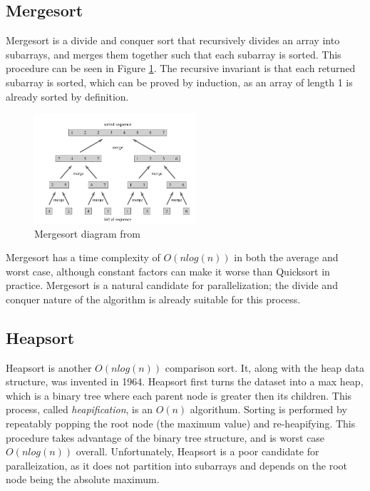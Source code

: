 \documentclass[conference]{IEEEtran}
\begin{document}
\subsection{Mergesort}
Mergesort is a divide and conquer sort that recursively divides an array into subarrays, and merges them together such that each subarray is sorted. 
This procedure can be seen in Figure \ref{mrg}.  
The recursive invariant is that each returned subarray is sorted, which can be proved by induction, as an array of length 1 is already sorted by definition. \cite{cormen_introduction_2009} 
\begin{figure}[h]
	\includegraphics[width=6cm]{merge.png} 
	\caption{Mergesort diagram from \cite{cormen_introduction_2009}}
	\label{mrg}
\end{figure}
Mergesort has a time complexity of $O(nlog(n))$ in both the average and worst case, although constant factors can make it worse than Quicksort in practice. 
Mergesort is a natural candidate for parallelization; the divide and conquer nature of the algorithm is already suitable for this process. 

\subsection{Heapsort}
Heapsort is another $O(n log(n))$ comparison sort. 
It, along with the heap data structure, was invented in 1964. \cite{forsythe_algorithms_1964}
Heapsort first turns the dataset into a max heap, which is a binary tree where each parent node is greater then its children. 
This process, called \textit{heapification}, is an $O(n)$ algorithum. 
Sorting is performed by repeatably popping the root node (the maximum value) and re-heapifying. 
This procedure takes advantage of the binary tree structure, and is worst case $O(n log (n))$ overall.  \cite{cormen_introduction_2009}
Unfortunately, Heapsort is a poor candidate for paralleization, as it does not partition into subarrays and depends on the root node being the absolute maximum. 
\end{document}
